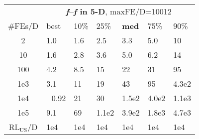 \begin{tabular}{c|llllll}
 & \multicolumn{6}{|c}{\textbf{\textit{f}\raisebox{-0.35ex}{1}--\textit{f}\raisebox{-0.35ex}{24} in 5-D}, maxFE/D=10012}\\
\#FEs/D & best & 10\% & 25\% & \textbf{med} & 75\% & 90\%\\
2 & \hspace*{1ex}1.0 & \hspace*{1ex}1.6 & \hspace*{1ex}2.5 & \hspace*{1ex}3.3 & \hspace*{1ex}5.0 & 10\\
10 & \hspace*{1ex}1.6 & \hspace*{1ex}2.8 & \hspace*{1ex}3.6 & \hspace*{1ex}5.0 & \hspace*{1ex}6.2 & 14\\
100 & \hspace*{1ex}4.2 & \hspace*{1ex}8.5 & 15 & 22 & 31 & 95\\
1e3 & \hspace*{1ex}3.1 & 11 & 19 & 43 & 95 & 4.3e2\\
1e4 & ~\,0.92 & 21 & 30 & 1.5e2 & 4.0e2 & 1.1e3\\
1e5 & \hspace*{1ex}9.1 & 69 & 1.1e2 & 3.9e2 & 1.8e3 & 4.7e3\\
$\text{RL}_{\text{US}}$/D & 1e4 & 1e4 & 1e4 & 1e4 & 1e4 & 1e4
\end{tabular}

